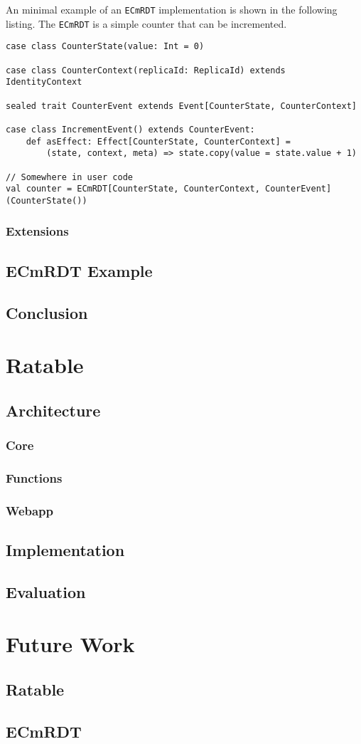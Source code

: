 \documentclass[
	ngerman,
	ruledheaders=section,   %
	class=report,		    %
	thesis={type=bachelor}, %
	accentcolor=9c,			%
	custommargins=false,    %
	marginpar=false,        %
	parskip=half-,          %
	fontsize=11pt,          %
]{tudapub}
\let\code\texttt
\begin{document}
An minimal example of an \code{ECmRDT} implementation is shown in the following listing. The \code{ECmRDT} is a simple counter that can be incremented.

\begin{lstlisting}
case class CounterState(value: Int = 0)

case class CounterContext(replicaId: ReplicaId) extends IdentityContext

sealed trait CounterEvent extends Event[CounterState, CounterContext]

case class IncrementEvent() extends CounterEvent:
	def asEffect: Effect[CounterState, CounterContext] =
		(state, context, meta) => state.copy(value = state.value + 1)

// Somewhere in user code
val counter = ECmRDT[CounterState, CounterContext, CounterEvent](CounterState())

\end{lstlisting}

\subsection{Extensions}

\section{ECmRDT Example}
\section{Conclusion}

\chapter{Ratable}
\section{Architecture}
\subsection{Core}
\subsection{Functions}
\subsection{Webapp}
\section{Implementation}
\section{Evaluation}

\chapter{Future Work}
\section{Ratable}
\section{ECmRDT}

\printbibliography
\end{document}

